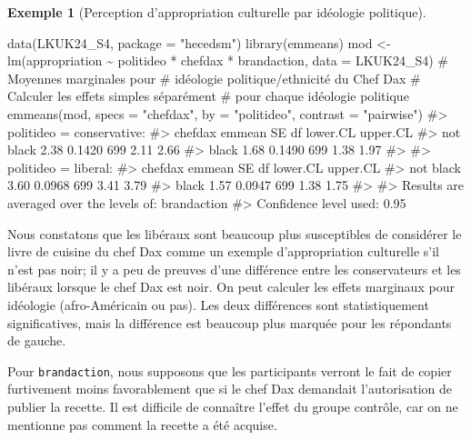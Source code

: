 \documentclass[
  11pt,
  letterpaper,
]{scrbook}
\newenvironment{Shaded}{\begin{snugshade}}{\end{snugshade}}
\newcommand{\AttributeTok}[1]{\textcolor[rgb]{0.40,0.45,0.13}{#1}}
\newcommand{\CommentTok}[1]{\textcolor[rgb]{0.37,0.37,0.37}{#1}}
\newcommand{\FunctionTok}[1]{\textcolor[rgb]{0.28,0.35,0.67}{#1}}
\newcommand{\NormalTok}[1]{\textcolor[rgb]{0.00,0.23,0.31}{#1}}
\newcommand{\OtherTok}[1]{\textcolor[rgb]{0.00,0.23,0.31}{#1}}
\newcommand{\SpecialCharTok}[1]{\textcolor[rgb]{0.37,0.37,0.37}{#1}}
\newcommand{\StringTok}[1]{\textcolor[rgb]{0.13,0.47,0.30}{#1}}
\theoremstyle{plain}
\theoremstyle{plain}
\theoremstyle{definition}
\newtheorem{example}{Exemple}[chapter]
\theoremstyle{definition}
\theoremstyle{remark}
\begin{document}
\begin{example}[Perception d'appropriation culturelle par idéologie
politique]
\begin{Shaded}
\begin{Highlighting}[]
\FunctionTok{data}\NormalTok{(LKUK24\_S4, }\AttributeTok{package =} \StringTok{"hecedsm"}\NormalTok{)}
\FunctionTok{library}\NormalTok{(emmeans)}
\NormalTok{mod }\OtherTok{\textless{}{-}} \FunctionTok{lm}\NormalTok{(appropriation }\SpecialCharTok{\textasciitilde{}}\NormalTok{ politideo }\SpecialCharTok{*}\NormalTok{ chefdax }\SpecialCharTok{*}\NormalTok{ brandaction,}
   \AttributeTok{data =}\NormalTok{ LKUK24\_S4)}
\CommentTok{\# Moyennes marginales pour }
\CommentTok{\# idéologie politique/ethnicité du Chef Dax}
\CommentTok{\# Calculer les effets simples séparément}
\CommentTok{\#  pour chaque idéologie politique}
\FunctionTok{emmeans}\NormalTok{(mod, }
         \AttributeTok{specs =} \StringTok{"chefdax"}\NormalTok{, }
         \AttributeTok{by =} \StringTok{"politideo"}\NormalTok{,}
         \AttributeTok{contrast =} \StringTok{"pairwise"}\NormalTok{)}
\CommentTok{\#\textgreater{} politideo = conservative:}
\CommentTok{\#\textgreater{}  chefdax   emmean     SE  df lower.CL upper.CL}
\CommentTok{\#\textgreater{}  not black   2.38 0.1420 699     2.11     2.66}
\CommentTok{\#\textgreater{}  black       1.68 0.1490 699     1.38     1.97}
\CommentTok{\#\textgreater{} }
\CommentTok{\#\textgreater{} politideo = liberal:}
\CommentTok{\#\textgreater{}  chefdax   emmean     SE  df lower.CL upper.CL}
\CommentTok{\#\textgreater{}  not black   3.60 0.0968 699     3.41     3.79}
\CommentTok{\#\textgreater{}  black       1.57 0.0947 699     1.38     1.75}
\CommentTok{\#\textgreater{} }
\CommentTok{\#\textgreater{} Results are averaged over the levels of: brandaction }
\CommentTok{\#\textgreater{} Confidence level used: 0.95}
\end{Highlighting}
\end{Shaded}

Nous constatons que les libéraux sont beaucoup plus susceptibles de
considérer le livre de cuisine du chef Dax comme un exemple
d'appropriation culturelle s'il n'est pas noir; il y a peu de preuves
d'une différence entre les conservateurs et les libéraux lorsque le chef
Dax est noir. On peut calculer les effets marginaux pour idéologie
(afro-Américain ou pas). Les deux différences sont statistiquement
significatives, mais la différence est beaucoup plus marquée pour les
répondants de gauche.

Pour \texttt{brandaction}, nous supposons que les participants verront
le fait de copier furtivement moins favorablement que si le chef Dax
demandait l'autorisation de publier la recette. Il est difficile de
connaître l'effet du groupe contrôle, car on ne mentionne pas comment la
recette a été acquise.


\end{example}
\end{document}
